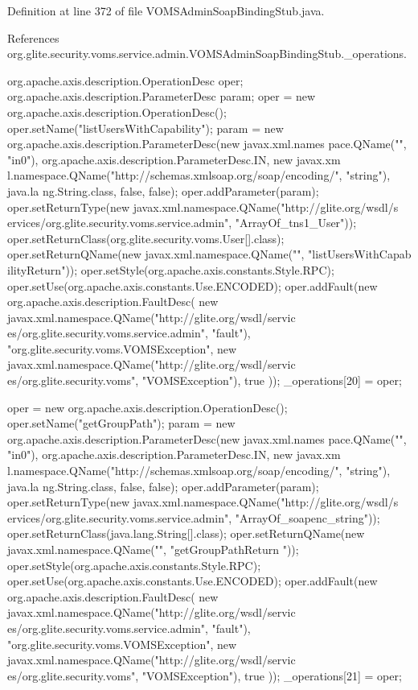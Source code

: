 Definition at line 372 of file VOMSAdminSoapBindingStub.java.



References org.glite.security.voms.service.admin.VOMSAdminSoapBindingStub.\_\-operations.


\begin{DoxyCode}
                                             {
        org.apache.axis.description.OperationDesc oper;
        org.apache.axis.description.ParameterDesc param;
        oper = new org.apache.axis.description.OperationDesc();
        oper.setName("listUsersWithCapability");
        param = new org.apache.axis.description.ParameterDesc(new javax.xml.names
      pace.QName("", "in0"), org.apache.axis.description.ParameterDesc.IN, new javax.xm
      l.namespace.QName("http://schemas.xmlsoap.org/soap/encoding/", "string"), java.la
      ng.String.class, false, false);
        oper.addParameter(param);
        oper.setReturnType(new javax.xml.namespace.QName("http://glite.org/wsdl/s
      ervices/org.glite.security.voms.service.admin", "ArrayOf_tns1_User"));
        oper.setReturnClass(org.glite.security.voms.User[].class);
        oper.setReturnQName(new javax.xml.namespace.QName("", "listUsersWithCapab
      ilityReturn"));
        oper.setStyle(org.apache.axis.constants.Style.RPC);
        oper.setUse(org.apache.axis.constants.Use.ENCODED);
        oper.addFault(new org.apache.axis.description.FaultDesc(
                      new javax.xml.namespace.QName("http://glite.org/wsdl/servic
      es/org.glite.security.voms.service.admin", "fault"),
                      "org.glite.security.voms.VOMSException",
                      new javax.xml.namespace.QName("http://glite.org/wsdl/servic
      es/org.glite.security.voms", "VOMSException"), 
                      true
                     ));
        _operations[20] = oper;

        oper = new org.apache.axis.description.OperationDesc();
        oper.setName("getGroupPath");
        param = new org.apache.axis.description.ParameterDesc(new javax.xml.names
      pace.QName("", "in0"), org.apache.axis.description.ParameterDesc.IN, new javax.xm
      l.namespace.QName("http://schemas.xmlsoap.org/soap/encoding/", "string"), java.la
      ng.String.class, false, false);
        oper.addParameter(param);
        oper.setReturnType(new javax.xml.namespace.QName("http://glite.org/wsdl/s
      ervices/org.glite.security.voms.service.admin", "ArrayOf_soapenc_string"));
        oper.setReturnClass(java.lang.String[].class);
        oper.setReturnQName(new javax.xml.namespace.QName("", "getGroupPathReturn
      "));
        oper.setStyle(org.apache.axis.constants.Style.RPC);
        oper.setUse(org.apache.axis.constants.Use.ENCODED);
        oper.addFault(new org.apache.axis.description.FaultDesc(
                      new javax.xml.namespace.QName("http://glite.org/wsdl/servic
      es/org.glite.security.voms.service.admin", "fault"),
                      "org.glite.security.voms.VOMSException",
                      new javax.xml.namespace.QName("http://glite.org/wsdl/servic
      es/org.glite.security.voms", "VOMSException"), 
                      true
                     ));
        _operations[21] = oper;

}
\end{DoxyCode}
